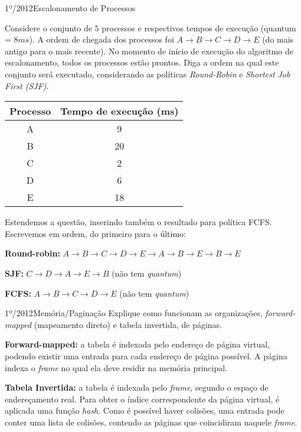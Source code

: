 \begin{exercicio}
  {1º/2012}{Escalonamento de Processos}
  {Considere o conjunto de $5$ processos e respectivos tempos de execução (quantum = $8 ms$). A ordem de chegada dos processos foi $A \rightarrow B \rightarrow C \rightarrow D \rightarrow E$ (do mais antigo para o mais recente). No momento de início de execução do algoritmo de escalonamento, todos os processos estão prontos. Diga a ordem na qual este conjunto será executado, considerando as políticas \textit{Round-Robin} e \textit{Shortest Job First (SJF)}.
  \begin{table}[H]
      \centering
      \begin{tabular}{cc}
        \hline \hline
        \textbf{Processo} & \textbf{Tempo de execução (ms)} \\ \hline
        A                 & 9                               \\
        B                 & 20                              \\
        C                 & 2                               \\
        D                 & 6                               \\
        E                 & 18                              \\
        \hline \hline
      \end{tabular}
    \end{table}
  }


    Estendemos a questão, inserindo também o resultado para política FCFS. Escrevemos em ordem, do primeiro para o último:

    \textbf{Round-robin:} $A \rightarrow B \rightarrow C \rightarrow D \rightarrow E \rightarrow A \rightarrow B \rightarrow E \rightarrow B \rightarrow E$

    \textbf{SJF:} $C \rightarrow D \rightarrow A \rightarrow E \rightarrow B$ (não tem \textit{quantum})

    \textbf{FCFS:} $A \rightarrow B \rightarrow C \rightarrow D \rightarrow E$ (não tem \textit{quantum})
\end{exercicio}

\begin{exercicio}
  {1º/2012}{Memória/Paginação}
  {Explique como funcionam as organizações, \textit{forward-mapped} (mapeamento direto) e tabela invertida, de páginas.}

  \textbf{Forward-mapped:} a tabela é indexada pelo endereço de página virtual, podendo existir uma entrada para cada endereço de página possível. A página indexa o \textit{frame} no qual ela deve residir na memória principal.

  \textbf{Tabela Invertida:} a tabela é indexada pelo \textit{frame}, segundo o espaço de endereçamento real. Para obter o índice correspondente da página virtual, é aplicada uma função \textit{hash}. Como é possível haver colisões, uma entrada pode conter uma lista de colisões, contendo as páginas que coincidiram naquele \textit{frame}.
\end{exercicio}

